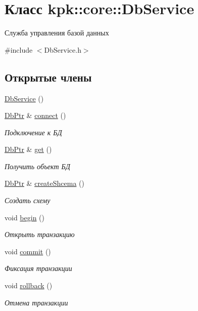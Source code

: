 \hypertarget{classkpk_1_1core_1_1_db_service}{}\section{Класс kpk\+:\+:core\+:\+:Db\+Service}
\label{classkpk_1_1core_1_1_db_service}


Служба управления базой данных  




{\ttfamily \#include $<$Db\+Service.\+h$>$}

\subsection*{Открытые члены}
\begin{DoxyCompactItemize}
\item 
\hyperlink{classkpk_1_1core_1_1_db_service_ad7213ea1a3e710889dcd06876c165d95}{Db\+Service} ()
\item 
\hyperlink{namespacekpk_1_1core_a57462cfcc109ed2afcc118d0668710cf}{Db\+Ptr} \& \hyperlink{classkpk_1_1core_1_1_db_service_a185ef44041963592970695ecac61f3c3}{connect} ()
\begin{DoxyCompactList}\small\item\em Подключение к БД \end{DoxyCompactList}\item 
\hyperlink{namespacekpk_1_1core_a57462cfcc109ed2afcc118d0668710cf}{Db\+Ptr} \& \hyperlink{classkpk_1_1core_1_1_db_service_a67de388a45320984577d9223918c13fb}{get} ()
\begin{DoxyCompactList}\small\item\em Получить объект БД \end{DoxyCompactList}\item 
\hyperlink{namespacekpk_1_1core_a57462cfcc109ed2afcc118d0668710cf}{Db\+Ptr} \& \hyperlink{classkpk_1_1core_1_1_db_service_aacb6bafd43eda109a2888bb0d6f86892}{create\+Shcema} ()
\begin{DoxyCompactList}\small\item\em Создать схему \end{DoxyCompactList}\item 
void \hyperlink{classkpk_1_1core_1_1_db_service_a2fcdfaec8a98b2a6224bfbf7e6e0a3b9}{begin} ()
\begin{DoxyCompactList}\small\item\em Открыть транзакцию \end{DoxyCompactList}\item 
void \hyperlink{classkpk_1_1core_1_1_db_service_a819d4e51894ea9950d69d7d159003aa5}{commit} ()
\begin{DoxyCompactList}\small\item\em Фиксация транзакции \end{DoxyCompactList}\item 
void \hyperlink{classkpk_1_1core_1_1_db_service_a360724207bed795a2ca720961d2808a9}{rollback} ()
\begin{DoxyCompactList}\small\item\em Отмена транзакции \end{DoxyCompactList}\end{DoxyCompactItemize}


